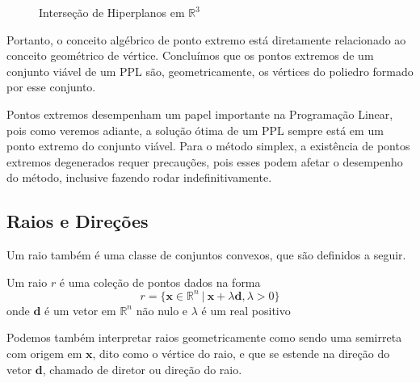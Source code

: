 \begin{itemize}
\begin{figure}[H]
	\caption{Interseção de Hiperplanos em $\mathbb{R}^3$}
	\end{figure}
\end{itemize}

Portanto, o conceito algébrico de ponto extremo está diretamente relacionado ao conceito geométrico de vértice. Concluímos que os pontos extremos de um conjunto viável de um PPL são, geometricamente, os vértices do poliedro formado por esse conjunto.


Pontos extremos desempenham um papel importante na Programação Linear, pois como veremos adiante, a solução ótima de um PPL sempre está em um ponto extremo do conjunto viável. Para o método simplex, a existência de pontos extremos degenerados requer precauções, pois esses podem afetar o desempenho do método, inclusive fazendo rodar indefinitivamente.

\subsection{Raios e Direções}

Um raio também é uma classe de conjuntos convexos, que são definidos a seguir.

\begin{def:raio}
	Um raio $r$ é uma coleção de pontos dados na forma
	\begin{equation*}
		r = \{\mathbf{x} \in \mathbb{R}^n \ |\  \mathbf{x} + \lambda \mathbf{d}, \lambda > 0\}
	\end{equation*}
	onde $\mathbf{d}$ é um vetor em $\mathbb{R}^n$ não nulo e $\lambda$ é um real positivo
\end{def:raio}

Podemos também interpretar raios geometricamente como sendo uma semirreta com origem em $\mathbf{x}$, dito como o vértice do raio, e que se estende na direção do vetor $\mathbf{d}$, chamado de diretor ou direção do raio.

